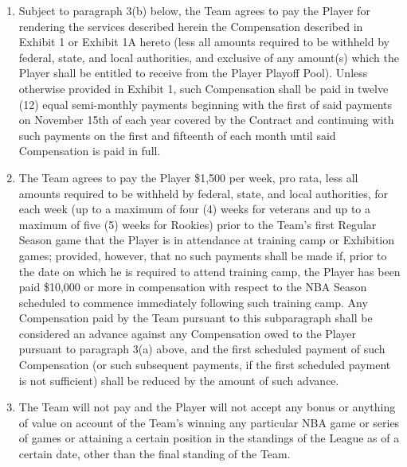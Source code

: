 \documentclass[
]{book}
\providecommand{\tightlist}{%
  \setlength{\itemsep}{0pt}\setlength{\parskip}{0pt}}
\begin{document}
\begin{enumerate}
\def\labelenumi{(\alph{enumi})}
\tightlist
\item
  Subject to paragraph 3(b) below, the Team agrees to pay the Player for rendering the services described herein the Compensation described in Exhibit 1 or Exhibit 1A hereto (less all amounts required to be withheld by federal, state, and local authorities, and exclusive of any amount(s) which the Player shall be entitled to receive from the Player Playoff Pool). Unless otherwise provided in Exhibit 1, such Compensation shall be paid in twelve (12) equal semi-monthly payments beginning with the first of said payments on November 15th of each year covered by the Contract and continuing with such payments on the first and fifteenth of each month until said Compensation is paid in full.
\item
  The Team agrees to pay the Player \$1,500 per week, pro rata, less all amounts required to be withheld by federal, state, and local authorities, for each week (up to a maximum of four (4) weeks for veterans and up to a maximum of five (5) weeks for Rookies) prior to the Team's first Regular Season game that the Player is in attendance at training camp or Exhibition games; provided, however, that no such payments shall be made if, prior to the date on which he is required to attend training camp, the Player has been paid \$10,000 or more in compensation with respect to the NBA Season scheduled to commence immediately following such training camp. Any Compensation paid by the Team pursuant to this subparagraph shall be considered an advance against any Compensation owed to the Player pursuant to paragraph 3(a) above, and the first scheduled payment of such Compensation (or such subsequent payments, if the first scheduled payment is not sufficient) shall be reduced by the amount of such advance.
\item
  The Team will not pay and the Player will not accept any bonus or anything of value on account of the Team's winning any particular NBA game or series of games or attaining a certain position in the standings of the League as of a certain date, other than the final standing of the Team.
\end{enumerate}
\end{document}

